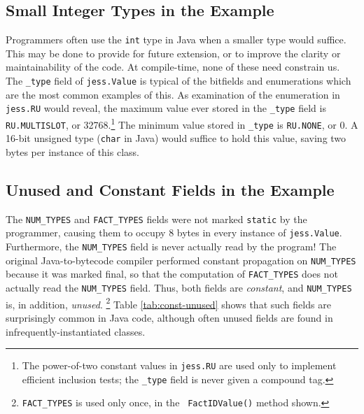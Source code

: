 \documentclass[preprint]{acmconf}
\begin{document}
\subsection{Small Integer Types in the Example}
\newcommand{\tyf}{\texttt{\_type}\xspace}

Programmers often use the {\tt int} type in Java when a smaller type
would suffice.  This may be done to provide for future extension, or
to improve the clarity or maintainability of the code.  At
compile-time, none of these need constrain us.  The \tyf field of 
{\tt jess.Value} is typical of the bitfields and enumerations which are
the most common examples of this.  As examination of the enumeration
in {\tt jess.RU} would reveal, the maximum value ever stored in the
\tyf field is {\tt RU.MULTISLOT}, or 32768.\footnote{The power-of-two
  constant values in {\tt jess.RU} are used only to implement
  efficient inclusion tests; the \tyf field is never given a compound
  tag.}  The minimum value stored in \tyf is {\tt RU.NONE}, or 0.  A
16-bit unsigned type ({\tt char} in Java) would suffice to hold this
value, saving two bytes per instance of this class.

\subsection{Unused and Constant Fields in the Example}
The {\tt NUM\_TYPES} and {\tt FACT\_TYPES} fields were not marked
{\tt static} by the programmer, causing them to occupy 8 bytes in every
instance of {\tt jess.Value}.  Furthermore, the {\tt NUM\_TYPES} field
is never actually read by the program!  The original Java-to-bytecode
compiler performed constant propagation on {\tt NUM\_TYPES} because it
was marked final, so that the computation of {\tt FACT\_TYPES} does
not actually read the {\tt NUM\_TYPES} field.  Thus, both fields are
{\it constant}, and {\tt NUM\_TYPES} is, in addition, {\it unused}.%
\footnote{{\tt FACT\_TYPES} is used only once, in the {\tt
    FactIDValue()} method shown.}
Table \ref{tab:const-unused} shows that such fields are surprisingly
common in Java code, although often unused fields are found in
infrequently-instantiated classes.
\end{document}

